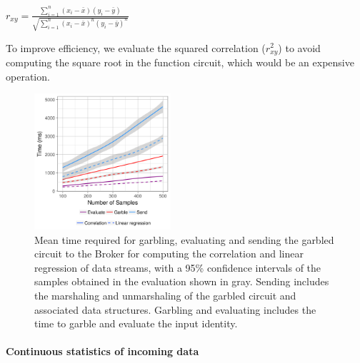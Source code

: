 


$r_{xy} = \frac{\displaystyle\sum_{i=1}^n (x_i - \bar{x}) (y_i - \bar{y})}
{\sqrt{\displaystyle\sum_{i=1}^n (x_i - \bar{x})^n (y_i - \bar{y})^n}}$

To improve efficiency, we evaluate the squared correlation ($r_{xy}^2$) to avoid
computing the square root in the function circuit, which would be an expensive
operation.

\begin{figure}
  \includegraphics[width=0.45\textwidth]{plots/stream.png}
  \caption{Mean time required for garbling, evaluating and sending the garbled
  circuit to the Broker for computing the correlation and linear regression of
  data streams, with a 95\% confidence intervals of the samples obtained in the
  evaluation shown in gray.  Sending includes the marshaling and unmarshaling
  of the garbled circuit and associated data structures.  Garbling and
  evaluating includes the time to garble and evaluate the input identity.}
  \label{stream-times}
\end{figure}

\paragraph{Continuous statistics of incoming data}


